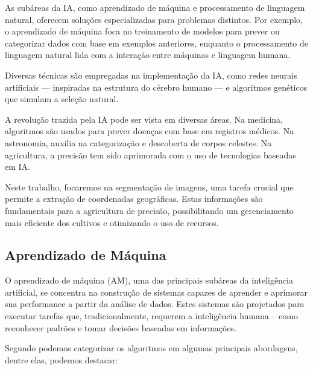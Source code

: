 \documentclass[conference]{IEEEtran}
\begin{document}
As subáreas da IA, como aprendizado de máquina e processamento de linguagem natural, 
oferecem soluções especializadas para problemas distintos. Por exemplo, o aprendizado
de máquina foca no treinamento de modelos para prever ou categorizar dados com base em
exemplos anteriores, enquanto o processamento de linguagem natural lida com a interação
entre máquinas e linguagem humana.
\cite{faceli2022inteligencia}

Diversas técnicas são empregadas na implementação da IA, como redes neurais artificiais
— inspiradas na estrutura do cérebro humano — e algoritmos genéticos que simulam a seleção natural.

A revolução trazida pela IA pode ser vista em diversas áreas. Na medicina, algoritmos são usados para
prever doenças com base em registros médicos. Na astronomia, auxilia na categorização e descoberta de
corpos celestes. Na agricultura, a precisão tem sido aprimorada com o uso de tecnologias baseadas em IA.
\cite{faceli2022inteligencia}

Neste trabalho, focaremos na segmentação de imagens, uma tarefa crucial que permite a extração de coordenadas
geográficas. Estas informações são fundamentais para a agricultura de precisão, possibilitando um gerenciamento
mais eficiente dos cultivos e otimizando o uso de recursos.

\subsection{Aprendizado de Máquina}
O aprendizado de máquina (AM), uma das principais subáreas da inteligência artificial, se concentra na 
construção de sistemas capazes de aprender e aprimorar sua performance a partir da análise de dados. 
Estes sistemas são projetados para executar tarefas que, tradicionalmente, requerem a inteligência 
humana – como reconhecer padrões e tomar decisões baseadas em informações.

Segundo \cite{faceli2022inteligencia} podemos categorizar os algoritmos em algumas principais 
abordagens, dentre elas, podemos destacar:
\end{document}
